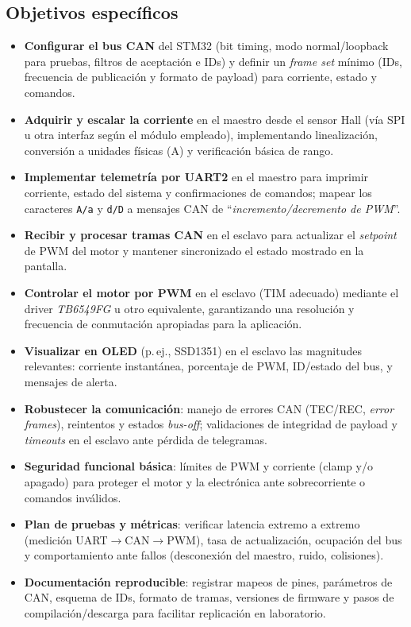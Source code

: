 \documentclass[a4paper,12pt]{article}
\begin{document}
\subsection{Objetivos específicos}
\begin{itemize}
  \item \textbf{Configurar el bus CAN} del STM32 (bit timing, modo normal/loopback para pruebas, filtros de aceptación e IDs) y definir un \emph{frame set} mínimo (IDs, frecuencia de publicación y formato de payload) para corriente, estado y comandos.
  \item \textbf{Adquirir y escalar la corriente} en el maestro desde el sensor Hall (vía SPI u otra interfaz según el módulo empleado), implementando linealización, conversión a unidades físicas (A) y verificación básica de rango.
  \item \textbf{Implementar telemetría por UART2} en el maestro para imprimir corriente, estado del sistema y confirmaciones de comandos; mapear los caracteres \texttt{A/a} y \texttt{d/D} a mensajes CAN de “\emph{incremento/decremento de PWM}”.
  \item \textbf{Recibir y procesar tramas CAN} en el esclavo para actualizar el \emph{setpoint} de PWM del motor y mantener sincronizado el estado mostrado en la pantalla.
  \item \textbf{Controlar el motor por PWM} en el esclavo (TIM adecuado) mediante el driver \emph{TB6549FG} u otro equivalente, garantizando una resolución y frecuencia de conmutación apropiadas para la aplicación.
  \item \textbf{Visualizar en OLED} (p.\,ej., SSD1351) en el esclavo las magnitudes relevantes: corriente instantánea, porcentaje de PWM, ID/estado del bus, y mensajes de alerta.
  \item \textbf{Robustecer la comunicación}: manejo de errores CAN (TEC/REC, \emph{error frames}), reintentos y estados \emph{bus-off}; validaciones de integridad de payload y \emph{timeouts} en el esclavo ante pérdida de telegramas.
  \item \textbf{Seguridad funcional básica}: límites de PWM y corriente (clamp y/o apagado) para proteger el motor y la electrónica ante sobrecorriente o comandos inválidos.
  \item \textbf{Plan de pruebas y métricas}: verificar latencia extremo a extremo (medición UART$\rightarrow$CAN$\rightarrow$PWM), tasa de actualización, ocupación del bus y comportamiento ante fallos (desconexión del maestro, ruido, colisiones).
  \item \textbf{Documentación reproducible}: registrar mapeos de pines, parámetros de CAN, esquema de IDs, formato de tramas, versiones de firmware y pasos de compilación/descarga para facilitar replicación en laboratorio.
\end{itemize}
\end{document}
